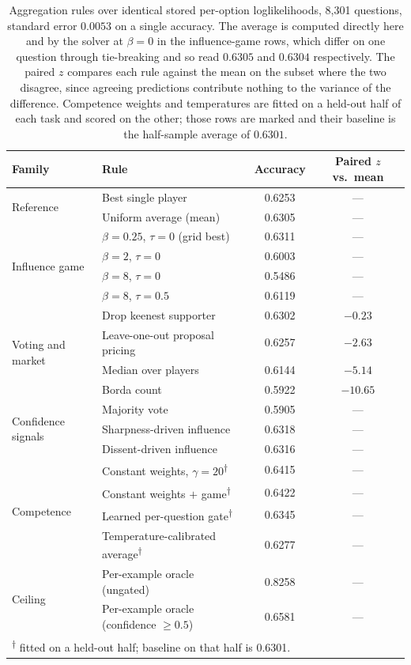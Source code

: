 \begin{table}[t]
\centering
\caption{Aggregation rules over identical stored per-option loglikelihoods,
8{,}301 questions, standard error $0.0053$ on a single accuracy. The average is
computed directly here and by the solver at $\beta = 0$ in the influence-game
rows, which differ on one question through tie-breaking and so read $0.6305$ and
$0.6304$ respectively. The paired
$z$ compares each rule against the mean on the subset where the two disagree,
since agreeing predictions contribute nothing to the variance of the difference.
Competence weights and temperatures are fitted on a held-out half of each task
and scored on the other; those rows are marked and their baseline is the
half-sample average of $0.6301$.}
\label{tab:aggregation}
\begin{tabular}{llcc}
\toprule
Family & Rule & Accuracy & Paired $z$ vs.\ mean \\
\midrule
\multirow{2}{*}{Reference} & Best single player & 0.6253 & --- \\
 & Uniform average (mean) & 0.6305 & --- \\
\midrule
\multirow{4}{*}{Influence game} & $\beta = 0.25$, $\tau = 0$ (grid best) & 0.6311 & --- \\
 & $\beta = 2$, $\tau = 0$ & 0.6003 & --- \\
 & $\beta = 8$, $\tau = 0$ & 0.5486 & --- \\
 & $\beta = 8$, $\tau = 0.5$ & 0.6119 & --- \\
\midrule
\multirow{4}{*}{Voting and market} & Drop keenest supporter & 0.6302 & $-0.23$ \\
 & Leave-one-out proposal pricing & 0.6257 & $-2.63$ \\
 & Median over players & 0.6144 & $-5.14$ \\
 & Borda count & 0.5922 & $-10.65$ \\
\midrule
\multirow{3}{*}{Confidence signals} & Majority vote & 0.5905 & --- \\
 & Sharpness-driven influence & 0.6318 & --- \\
 & Dissent-driven influence & 0.6316 & --- \\
\midrule
\multirow{4}{*}{Competence} & Constant weights, $\gamma = 20$\textsuperscript{$\dagger$} & 0.6415 & --- \\
 & Constant weights $+$ game\textsuperscript{$\dagger$} & 0.6422 & --- \\
 & Learned per-question gate\textsuperscript{$\dagger$} & 0.6345 & --- \\
 & Temperature-calibrated average\textsuperscript{$\dagger$} & 0.6277 & --- \\
\midrule
\multirow{2}{*}{Ceiling} & Per-example oracle (ungated) & 0.8258 & --- \\
 & Per-example oracle (confidence $\geq 0.5$) & 0.6581 & --- \\
\bottomrule
\multicolumn{4}{l}{\footnotesize \textsuperscript{$\dagger$} fitted on a held-out half; baseline on that half is 0.6301.} \\
\end{tabular}
\end{table}

